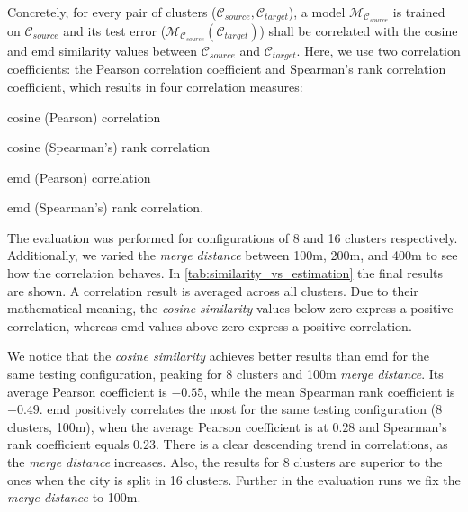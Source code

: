 	
	 
	Concretely, for every pair of clusters ($\mathcal{C}_{source}, \mathcal{C}_{target}$), a model $\mathcal{M}_{\mathcal{C}_{source}}$ is trained on $\mathcal{C}_{source}$ and its test error ($\mathcal{M}_{\mathcal{C}_{source}}(\mathcal{C}_{target})$) shall be correlated with the cosine and emd similarity values between $\mathcal{C}_{source}$ and $\mathcal{C}_{target}$. Here, we use two correlation coefficients: the Pearson correlation coefficient and Spearman's rank correlation coefficient, which results in four correlation measures: 
	\begin{romanlist}
		\item	cosine (Pearson) correlation
		\item 	cosine (Spearman's) rank correlation
		\item 	emd (Pearson) correlation
		\item 	emd (Spearman's) rank correlation. 
	\end{romanlist}
	The evaluation was performed for configurations of 8 and 16 clusters respectively. Additionally, we varied the \textit{merge distance} between 100m, 200m, and 400m to see how the correlation behaves. In \cref{tab:similarity_vs_estimation} the final results are shown. A correlation result is averaged across all clusters. Due to their mathematical meaning, the \textit{cosine similarity} values below zero express a positive correlation, whereas emd values above zero express a positive correlation. 
	
	We notice that the \textit{cosine similarity} achieves better results than emd for the same testing configuration, peaking for 8 clusters and 100m \textit{merge distance}. Its average Pearson coefficient is $-0.55$, while the mean Spearman rank coefficient is $-0.49$. emd positively correlates the most for the same testing configuration (8 clusters, 100m), when the average Pearson coefficient is at $0.28$ and Spearman's rank coefficient equals $0.23$. There is a clear descending trend in correlations, as the \textit{merge distance} increases.  Also, the results for 8 clusters are superior to the ones when the city is split in 16 clusters. Further in the evaluation runs we fix the \textit{merge distance} to 100m.
	
